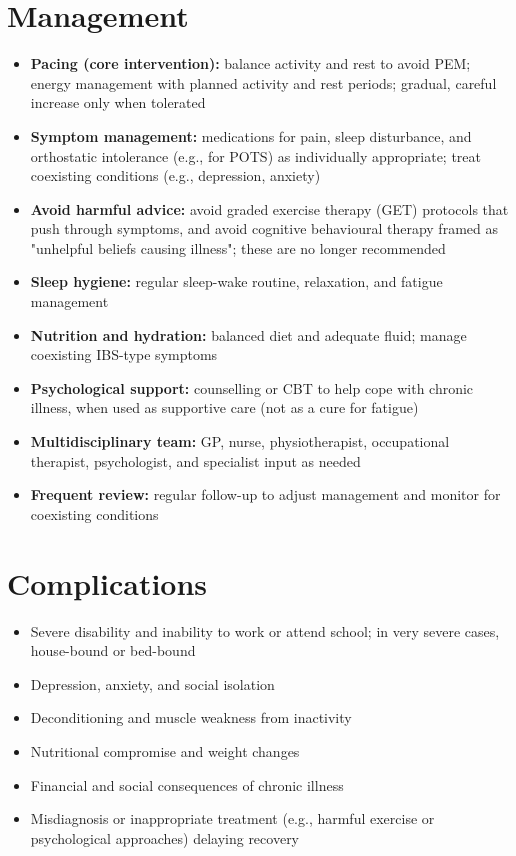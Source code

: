 \section*{Management}
\begin{itemize}
    \item \textbf{Pacing (core intervention):} balance activity and rest to avoid PEM; energy management with planned activity and rest periods; gradual, careful increase only when tolerated
    \item \textbf{Symptom management:} medications for pain, sleep disturbance, and orthostatic intolerance (e.g., for POTS) as individually appropriate; treat coexisting conditions (e.g., depression, anxiety)
    \item \textbf{Avoid harmful advice:} avoid graded exercise therapy (GET) protocols that push through symptoms, and avoid cognitive behavioural therapy framed as "unhelpful beliefs causing illness"; these are no longer recommended
    \item \textbf{Sleep hygiene:} regular sleep-wake routine, relaxation, and fatigue management
    \item \textbf{Nutrition and hydration:} balanced diet and adequate fluid; manage coexisting IBS-type symptoms
    \item \textbf{Psychological support:} counselling or CBT to help cope with chronic illness, when used as supportive care (not as a cure for fatigue)
    \item \textbf{Multidisciplinary team:} GP, nurse, physiotherapist, occupational therapist, psychologist, and specialist input as needed
    \item \textbf{Frequent review:} regular follow-up to adjust management and monitor for coexisting conditions
\end{itemize}

\section*{Complications}
\begin{itemize}
    \item Severe disability and inability to work or attend school; in very severe cases, house-bound or bed-bound
    \item Depression, anxiety, and social isolation
    \item Deconditioning and muscle weakness from inactivity
    \item Nutritional compromise and weight changes
    \item Financial and social consequences of chronic illness
    \item Misdiagnosis or inappropriate treatment (e.g., harmful exercise or psychological approaches) delaying recovery
\end{itemize}

